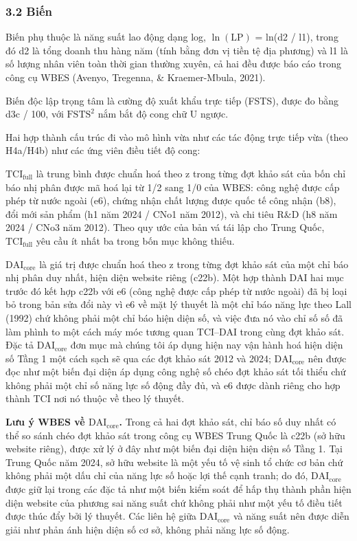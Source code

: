 \documentclass[12pt,a4paper]{article}
\begin{document}
\hypertarget{32-biux1ebfn}{%
\subsubsection{3.2 Biến}\label{32-biux1ebfn}}

Biến phụ thuộc là năng suất lao động dạng log, \(\ln(\mathrm{LP})\) =
ln(d2 / l1), trong đó d2 là tổng doanh thu hàng năm (tính bằng đơn vị
tiền tệ địa phương) và l1 là số lượng nhân viên toàn thời gian thường
xuyên, cả hai đều được báo cáo trong công cụ WBES (Avenyo, Tregenna, \&
Kraemer-Mbula, 2021).

Biến độc lập trọng tâm là cường độ xuất khẩu trực tiếp (FSTS), được đo
bằng d3c / 100, với \(\mathrm{FSTS}^2\) nắm bắt độ cong chữ U ngược.

Hai hợp thành cấu trúc đi vào mô hình vừa như các tác động trực tiếp vừa
(theo H4a/H4b) như các ứng viên điều tiết độ cong:

\textbf{\(\mathrm{TCI}_{\text{full}}\)} là trung bình được chuẩn hoá
theo z trong từng đợt khảo sát của bốn chỉ báo nhị phân được mã hoá lại
từ 1/2 sang 1/0 của WBES: công nghệ được cấp phép từ nước ngoài (e6),
chứng nhận chất lượng được quốc tế công nhận (b8), đổi mới sản phẩm (h1
năm 2024 / CNo1 năm 2012), và chi tiêu R\&D (h8 năm 2024 / CNo3 năm
2012). Theo quy ước của bản vá tái lập cho Trung Quốc,
\(\mathrm{TCI}_{\text{full}}\) yêu cầu ít nhất ba trong bốn mục không
thiếu.

\textbf{\(\mathrm{DAI}_{\text{core}}\)} là giá trị được chuẩn hoá theo z
trong từng đợt khảo sát của một chỉ báo nhị phân duy nhất, hiện diện
website riêng (c22b). Một hợp thành DAI hai mục trước đó kết hợp c22b
với e6 (công nghệ được cấp phép từ nước ngoài) đã bị loại bỏ trong bản
sửa đổi này vì e6 về mặt lý thuyết là một chỉ báo năng lực theo Lall
(1992) chứ không phải một chỉ báo hiện diện số, và việc đưa nó vào chỉ
số số đã làm phình to một cách máy móc tương quan TCI--DAI trong cùng
đợt khảo sát. Đặc tả \(\mathrm{DAI}_{\text{core}}\) đơn mục mà chúng tôi
áp dụng hiện nay vận hành hoá hiện diện số Tầng 1 một cách sạch sẽ qua
các đợt khảo sát 2012 và 2024; \(\mathrm{DAI}_{\text{core}}\) nên được
đọc như một biến đại diện áp dụng công nghệ số chéo đợt khảo sát tối
thiểu chứ không phải một chỉ số năng lực số động đầy đủ, và e6 được dành
riêng cho hợp thành TCI nơi nó thuộc về theo lý thuyết.

\textbf{Lưu ý WBES về \(\mathrm{DAI}_{\text{core}}\).} Trong cả hai đợt
khảo sát, chỉ báo số duy nhất có thể so sánh chéo đợt khảo sát trong
công cụ WBES Trung Quốc là c22b (sở hữu website riêng), được xử lý ở đây
như một biến đại diện hiện diện số Tầng 1. Tại Trung Quốc năm 2024, sở
hữu website là một yếu tố vệ sinh tổ chức cơ bản chứ không phải một dấu
chỉ của năng lực số hoặc lợi thế cạnh tranh; do đó,
\(\mathrm{DAI}_{\text{core}}\) được giữ lại trong các đặc tả như một
biến kiểm soát để hấp thụ thành phần hiện diện website của phương sai
năng suất chứ không phải như một yếu tố điều tiết được thúc đẩy bởi lý
thuyết. Các liên hệ giữa \(\mathrm{DAI}_{\text{core}}\) và năng suất nên
được diễn giải như phản ánh hiện diện số cơ sở, không phải năng lực số
động.
\end{document}
